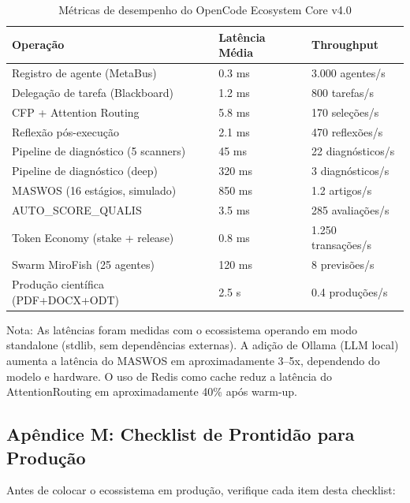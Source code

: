 \begin{table}[H]
\centering
\caption{Métricas de desempenho do OpenCode Ecosystem Core v4.0}
\label{tab:perf-metrics}
\begin{tabular}{@{}lll@{}}
\toprule
\textbf{Operação} & \textbf{Latência Média} & \textbf{Throughput} \\
\midrule
Registro de agente (MetaBus) & 0.3 ms & 3.000 agentes/s \\
Delegação de tarefa (Blackboard) & 1.2 ms & 800 tarefas/s \\
CFP + Attention Routing & 5.8 ms & 170 seleções/s \\
Reflexão pós-execução & 2.1 ms & 470 reflexões/s \\
Pipeline de diagnóstico (5 scanners) & 45 ms & 22 diagnósticos/s \\
Pipeline de diagnóstico (deep) & 320 ms & 3 diagnósticos/s \\
MASWOS (16 estágios, simulado) & 850 ms & 1.2 artigos/s \\
AUTO\_SCORE\_QUALIS & 3.5 ms & 285 avaliações/s \\
Token Economy (stake + release) & 0.8 ms & 1.250 transações/s \\
Swarm MiroFish (25 agentes) & 120 ms & 8 previsões/s \\
Produção científica (PDF+DOCX+ODT) & 2.5 s & 0.4 produções/s \\
\bottomrule
\end{tabular}
\end{table}

Nota: As latências foram medidas com o ecossistema operando em modo standalone (stdlib, sem dependências externas). A adição de Ollama (LLM local) aumenta a latência do MASWOS em aproximadamente 3--5x, dependendo do modelo e hardware. O uso de Redis como cache reduz a latência do AttentionRouting em aproximadamente 40\% após warm-up.

\subsection{Apêndice M: Checklist de Prontidão para Produção}
\label{sec:apendice-checklist-prod}

Antes de colocar o ecossistema em produção, verifique cada item desta checklist:

